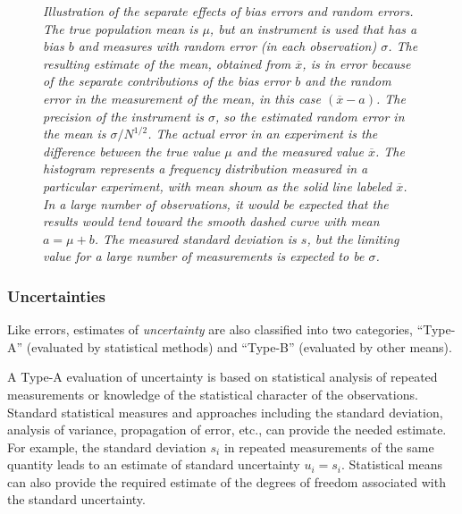 \documentclass[12pt,twoside,english]{article}\usepackage[]{graphicx}\usepackage[]{color}
\let\OrgIndex\index
\renewcommand*{\index}[1]{\OrgIndex{#1}}
\begin{document}
{{\begin{figure}[H]
\protect\caption[Illustration of the separate effects of bias errors and random errors.]{\emph{\label{fig:IllustrationOfTerms}Illustration of the separate effects of bias errors and random errors. The true population mean is $\mu$, but an instrument is used that has a bias $b$ and measures with random error (in each observation) $\sigma$. The resulting estimate of the mean, obtained from $\overline{x}$, is in error because of the separate contributions of the bias error $b$ and the random error in the measurement of the mean, in this case $(\overline{x}-a)$. The precision of the instrument is $\sigma$, so the estimated random error in the mean is $\sigma/{N}^{1/2}$. The actual error in an experiment is the difference between the true value $\mu$ and the measured value $\overline{x}$. The histogram represents a frequency distribution measured in a particular experiment, with mean shown as the solid line labeled $\overline{x}$. In a large number of observations, it would be expected that the results would tend toward the smooth dashed curve with mean $a=\mu+b$. The measured standard deviation is $s$, but the limiting value for a large number of measurements is expected to be $\sigma$.} } 


\end{figure}

\subsubsection{Uncertainties}

Like errors, estimates of \emph{uncertainty} are also classified into two categories, ``Type-A'' (evaluated by statistical methods) and ``Type-B'' (evaluated by other means). 


A Type-A evaluation of uncertainty is based on statistical analysis of repeated measurements or knowledge of the statistical character of the observations. Standard statistical measures and approaches including the standard deviation, analysis of variance, propagation of error, etc., can provide the needed estimate. For example, the standard deviation $s_{i}$ in repeated measurements of the same quantity leads to an estimate of standard uncertainty  $u_{i}=s_{i}$. Statistical means can also provide the required estimate of the degrees of freedom associated with the standard uncertainty. 

}}
\end{document}
